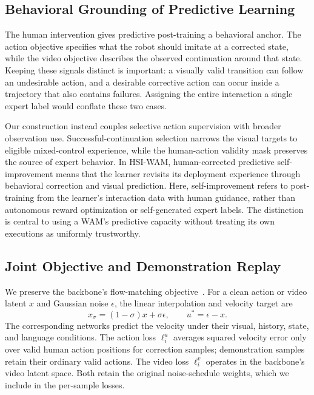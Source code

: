 \documentclass[letterpaper,10pt,conference]{ieeeconf}
\begin{document}
\subsection{Behavioral Grounding of Predictive Learning}
The human intervention gives predictive post-training a behavioral anchor. The action objective specifies what the robot should imitate at a corrected state, while the video objective describes the observed continuation around that state. Keeping these signals distinct is important: a visually valid transition can follow an undesirable action, and a desirable corrective action can occur inside a trajectory that also contains failures. Assigning the entire interaction a single expert label would conflate these two cases.

Our construction instead couples selective action supervision with broader observation use. Successful-continuation selection narrows the visual targets to eligible mixed-control experience, while the human-action validity mask preserves the source of expert behavior. In HSI-WAM, human-corrected predictive self-improvement means that the learner revisits its deployment experience through behavioral correction and visual prediction. Here, self-improvement refers to post-training from the learner's interaction data with human guidance, rather than autonomous reward optimization or self-generated expert labels. The distinction is central to using a WAM's predictive capacity without treating its own executions as uniformly trustworthy.

\subsection{Joint Objective and Demonstration Replay}
We preserve the backbone's flow-matching objective~\cite{flow}. For a clean action or video latent $x$ and Gaussian noise $\epsilon$, the linear interpolation and velocity target are
\begin{equation}
 x_\sigma=(1-\sigma)x+\sigma\epsilon,\qquad
 u^*=\epsilon-x.
 \label{eq:flow}
\end{equation}
The corresponding networks predict the velocity under their visual, history, state, and language conditions. The action loss $\ell_i^a$ averages squared velocity error only over valid human action positions for correction samples; demonstration samples retain their ordinary valid actions. The video loss $\ell_i^v$ operates in the backbone's video latent space. Both retain the original noise-schedule weights, which we include in the per-sample losses.
\end{document}
